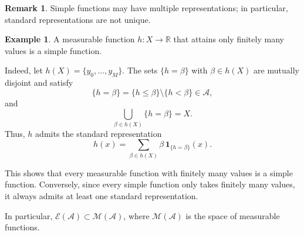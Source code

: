 \documentclass[12pt]{article}
\theoremstyle{definition}
\newtheorem{example}{Example}[section]
\newtheorem{remark}{Remark}[section]
\begin{document}
\begin{remark}
Simple functions may have multiple representations; in particular, standard representations are not unique.
\end{remark}

\medskip
\begin{example}
A measurable function \( h : X \to \mathbb{R} \) that attains only finitely many values is a simple function.

Indeed, let \( h(X) = \{ y_0, \dots, y_M \} \). The sets \( \{ h = \beta \} \) with \( \beta \in h(X) \) are mutually disjoint and satisfy
\[
\{ h = \beta \} = \{ h \leq \beta \} \setminus \{ h < \beta \} \in \mathcal{A},
\]
and
\[
\bigcup_{\beta \in h(X)} \{ h = \beta \} = X.
\]
Thus, \( h \) admits the standard representation
\[
h(x) = \sum_{\beta \in h(X)} \beta \, \mathbf{1}_{\{ h = \beta \}}(x).
\]

This shows that every measurable function with finitely many values is a simple function. Conversely, since every simple function only takes finitely many values, it always admits at least one standard representation.

In particular, \( \mathcal{E}(\mathcal{A}) \subset \mathcal{M}(\mathcal{A}) \), where \( \mathcal{M}(\mathcal{A}) \) is the space of measurable functions.
\end{example}
\end{document}

